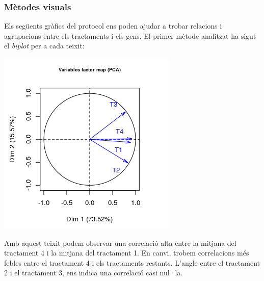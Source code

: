\documentclass[english]{article}
\begin{document}
\subsubsection{Mètodes visuals}
Els següents gràfics del protocol ens poden ajudar a trobar relacions i agrupacions entre els tractaments i els gens. El primer mètode analitzat ha sigut el \textit{biplot} per a cada teixit:
\begin{center}
\includegraphics[scale=0.6]{biploti.png}
\end{center}
Amb aquest teixit podem observar una correlació alta entre la mitjana del tractament 4 i la mitjana del tractament 1. En canvi, trobem correlacions més febles entre el tractament 4 i els tractaments restants. L'angle entre el tractament 2 i el tractament 3, ens indica una correlació casi nul·la.
\end{document}
